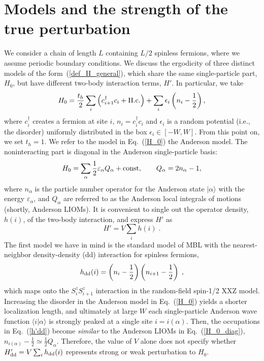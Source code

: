 \documentclass[twocolumn,pre,superscriptaddress,10pt,aps,floatfix]{revtex4-1}
\begin{document}
\section{Models and the strength of  the true perturbation} \label{sec:models}
 
We consider a chain of length $L$ containing $L/2$  spinless fermions, where we assume periodic boundary conditions. We discuss the ergodicity of three distinct models of the form~(\ref{def_H_general}), which share the same single-particle part, $H_0$, but have different two-body interaction terms, $H'$. In particular, we take
\begin{equation}
H_0=\frac{t_h}{2} \sum_i \left(c^{\dagger}_{i+1} c_i +{\rm H.c.} \right) +\sum_i \epsilon_i \left(n_i-\frac{1}{2}\right), \label{H_0}
\end{equation}
where $c^{\dagger}_i$ creates a fermion at site  $i$, $n_i=c^{\dagger}_i c_i$ and $\epsilon_i$ is a random potential (i.e., the disorder) uniformly distributed in the box $\epsilon_i \in [-W,W]$. From this point on, we set $t_h=1$.
We refer to the model in Eq.~(\ref{H_0}) the Anderson model.
The noninteracting part is diagonal in the Anderson single-particle basis:
\begin{equation}
H_0= \sum_{\alpha} \frac{1}{2} \varepsilon_{\alpha}  Q_{\alpha} +{\rm const}, \quad \quad   Q_{\alpha}=2 n_{\alpha} -1, \label{H_0_diag}
\end{equation}     
where $n_{\alpha}$ is the particle number operator for the Anderson state $|\alpha \rangle$ with the energy $\varepsilon_{\alpha}$, and $Q_{\alpha}$ are referred to as the Anderson local integrals of motions (shortly, Anderson LIOMs).  It is convenient to single out the operator density, $h(i)$, of the two-body interaction, and express $H'$ as
\begin{equation}
H' = V \sum_i h(i)\;. \label{h'}
\end{equation}
The first model we have in mind is the standard model of MBL with the nearest-neighbor density-density (dd) interaction for spinless fermions,
\begin{equation}
h_{\rm dd}(i)  =  \left(n_i-\frac{1}{2}\right)\left(n_{i+1}-\frac{1}{2}\right)\;, \label{h'dd}
\end{equation}
which maps onto the $S^z_i S^z_{i+1}$ interaction in the random-field spin-1/2 XXZ model.
Increasing the disorder in the Anderson model in Eq.~(\ref{H_0}) yields a shorter localization length, and ultimately at large $W$ each single-particle Anderson wave function $\langle i | \alpha \rangle$ is strongly peaked at a single site $i=i(\alpha)$.
Then, the occupations in Eq.~(\ref{h'dd}) become {\em similar} to the Anderson LIOMs in Eq.~(\ref{H_0_diag}), \mbox{$ n_{i(\alpha)}-\frac{1}{2} \simeq \frac{1}{2} Q_{\alpha}$}. Therefore, the value of $V$ alone does not specify whether  \mbox{$H'_{\rm dd} = V \sum_i h_{\rm dd}(i)$}  
represents strong or weak perturbation to $H_0$. 
\end{document}

